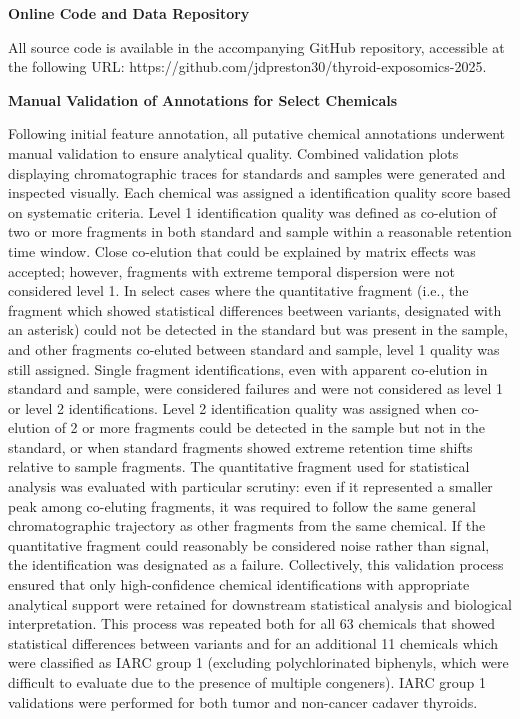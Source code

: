 \noindent\textbf{Online Code and Data Repository}

All source code is available in the accompanying GitHub repository, accessible at the following URL: https://github.com/jdpreston30/thyroid-exposomics-2025.

\vspace{1em}

\noindent\textbf{Manual Validation of Annotations for Select Chemicals}

Following initial feature annotation, all putative chemical annotations underwent manual validation to ensure analytical quality. Combined validation plots displaying chromatographic traces for standards and samples were generated and inspected visually. Each chemical was assigned a identification quality score based on systematic criteria. Level 1 identification quality was defined as co-elution of two or more fragments in both standard and sample within a reasonable retention time window. Close co-elution that could be explained by matrix effects was accepted; however, fragments with extreme temporal dispersion were not considered level 1. In select cases where the quantitative fragment (i.e., the fragment which showed statistical differences beetween variants, designated with an asterisk) could not be detected in the standard but was present in the sample, and other fragments co-eluted between standard and sample, level 1 quality was still assigned. Single fragment identifications, even with apparent co-elution in standard and sample, were considered failures and were not considered as level 1 or level 2 identifications. Level 2 identification quality was assigned when co-elution of 2 or more fragments could be detected in the sample but not in the standard, or when standard fragments showed extreme retention time shifts relative to sample fragments. The quantitative fragment used for statistical analysis was evaluated with particular scrutiny: even if it represented a smaller peak among co-eluting fragments, it was required to follow the same general chromatographic trajectory as other fragments from the same chemical. If the quantitative fragment could reasonably be considered noise rather than signal, the identification was designated as a failure. Collectively, this validation process ensured that only high-confidence chemical identifications with appropriate analytical support were retained for downstream statistical analysis and biological interpretation. This process was repeated both for all 63 chemicals that showed statistical differences between variants and for an additional 11 chemicals which were classified as IARC group 1 (excluding polychlorinated biphenyls, which were difficult to evaluate due to the presence of multiple congeners). IARC group 1 validations were performed for both tumor and non-cancer cadaver thyroids.

